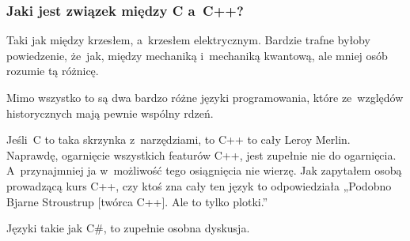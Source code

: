 \documentclass[10pt,t]{beamer}
\begin{document}
\begin{frame}
  \frametitle{Jaki jest związek między C a~C++?}


  Taki jak między krzesłem, a~krzesłem elektrycznym. Bardzie trafne byłoby
  powiedzenie, że~jak, między mechaniką i~mechaniką kwantową, ale mniej
  osób rozumie tą różnicę.

  Mimo wszystko to są dwa bardzo różne języki programowania, które
  ze~względów historycznych mają pewnie wspólny rdzeń.

  Jeśli~C to taka skrzynka z~narzędziami, to C++ to cały Leroy
  Merlin. Naprawdę, ogarnięcie wszystkich featurów C++, jest zupełnie nie do
  ogarnięcia. A~przynajmniej ja w~możliwość tego osiągnięcia nie wierzę.
  Jak zapytałem osobą prowadzącą kurs C++, czy ktoś zna cały ten język
  to odpowiedziała „Podobno Bjarne Stroustrup [twórca C++]. Ale to tylko
  plotki.”

  Języki takie jak C\#, to zupełnie osobna dyskusja.

\end{frame}












\end{document}
